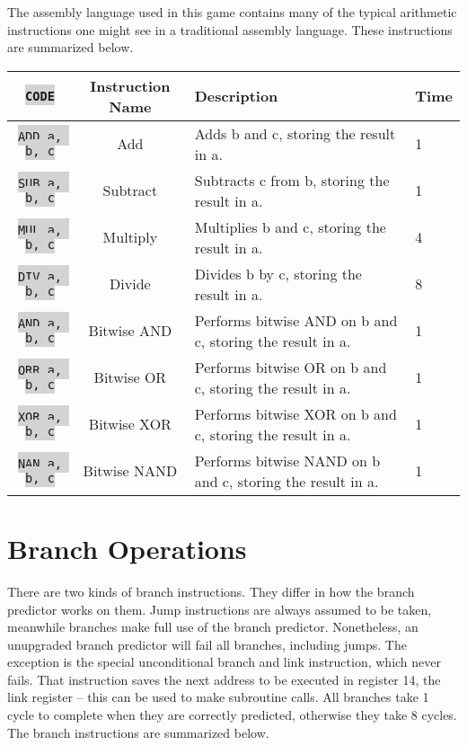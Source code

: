 \documentclass{article}
\newcommand{\vnscode}[1]{\colorbox{lightgray}{\lstinline[language=vns]{#1}}}
\begin{document}
The assembly language used in this game contains many of the typical
arithmetic instructions one might see in a traditional assembly language. These
instructions are summarized below.

\begin{minipage}{\textwidth}
\centering
\begin{tabular}{|c|c|l|l|}
    \hline \vnscode{CODE} & Instruction Name & Description & Time \\ \hline
    \vnscode{ADD a, b, c} & Add & Adds b and c, storing the result in a. & 1 \\ \hline
    \vnscode{SUB a, b, c} & Subtract & Subtracts c from b, storing the result in a. & 1 \\ \hline
    \vnscode{MUL a, b, c} & Multiply & Multiplies b and c, storing the result in a. & 4 \\ \hline
    \vnscode{DIV a, b, c} & Divide & Divides b by c, storing the result in a. & 8 \\ \hline
    \vnscode{AND a, b, c} & Bitwise AND & Performs bitwise AND on b and c, storing the result in a. & 1 \\ \hline
    \vnscode{ORR a, b, c} & Bitwise OR & Performs bitwise OR on b and c, storing the result in a. & 1 \\ \hline
    \vnscode{XOR a, b, c} & Bitwise XOR & Performs bitwise XOR on b and c, storing the result in a. & 1 \\ \hline
    \vnscode{NAN a, b, c} & Bitwise NAND & Performs bitwise NAND on b and c, storing the result in a. & 1 \\ \hline
\end{tabular}
\end{minipage}

\section{Branch Operations}

There are two kinds of branch instructions. They differ in how the branch
predictor works on them. Jump instructions are always assumed to be taken,
meanwhile branches make full use of the branch predictor. Nonetheless, an
unupgraded branch predictor will fail all branches, including jumps. The
exception is the special unconditional branch and link instruction, which never
fails. That instruction saves the next address to be executed in register 14,
the link register -- this can be used to make subroutine calls. All branches
take 1 cycle to complete when they are correctly predicted, otherwise they take
8 cycles. The branch instructions are summarized below.
\end{document}
